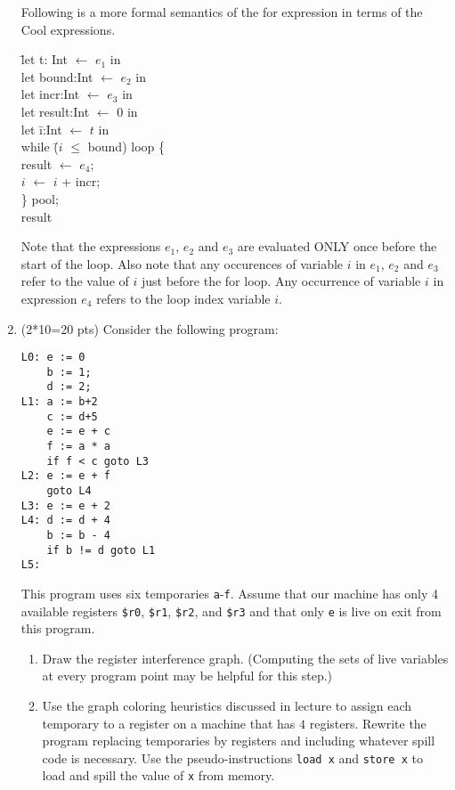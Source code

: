 \documentclass[10pt]{article}
\begin{document}
\begin{enumerate}
Following is a more formal semantics of the for expression in terms of the Cool
expressions.
\begin{tabbing}
  \hspace*{3mm} \= let t: Int $\leftarrow$ $e_1$ in \\
  \> let bound:Int  $\leftarrow$ $e_2$ in \\
  \> let incr:Int  $\leftarrow$ $e_3$ in \\
  \> let result:Int  $\leftarrow$ $0$ in \\
  \> let \= i:Int $\leftarrow$ $t$ in   \\
   \>  \> while \= ($i$ $\leq$ bound) loop \{ \\
     \>\>\>   result $\leftarrow$ $e_4$; \\
\> \> \> $i$ $\leftarrow$ $i$ + incr; \\
     \> \> \} pool; \\
     \> \> result  \\
\end{tabbing}

Note that the expressions $e_1$, $e_2$ and $e_3$ are evaluated ONLY once before the start of the loop.
Also note that any occurences of variable $i$ in $e_1$, $e_2$ and
$e_3$ refer to the value of $i$
just before the for loop.
Any occurrence of variable $i$ in expression $e_4$ refers to the loop index variable $i$.


\item (2*10=20 pts) Consider the following program:

\begin{verbatim}
L0: e := 0
    b := 1;
    d := 2;
L1: a := b+2
    c := d+5
    e := e + c
    f := a * a
    if f < c goto L3
L2: e := e + f
    goto L4
L3: e := e + 2
L4: d := d + 4
    b := b - 4
    if b != d goto L1
L5:
\end{verbatim}

This program uses six temporaries \texttt{a}-\texttt{f}.  Assume that
our machine has only 4 available registers \texttt{\$r0},
\texttt{\$r1}, \texttt{\$r2}, and \texttt{\$r3}
and that only
\texttt{e} is live on exit from this program.

\begin{enumerate}
\item Draw the register interference graph.  (Computing the sets of
live variables at every program point may be helpful for this step.)

\item Use the graph coloring heuristics discussed in lecture to assign
  each temporary to a register on a machine that has $4$ registers.
Rewrite the program replacing temporaries by registers and including whatever
spill code is necessary.  Use the pseudo-instructions \texttt{load x}
and \texttt{store x} to load and spill the value of \texttt{x} from
memory.
\end{enumerate}


\end{enumerate}
\end{document}
